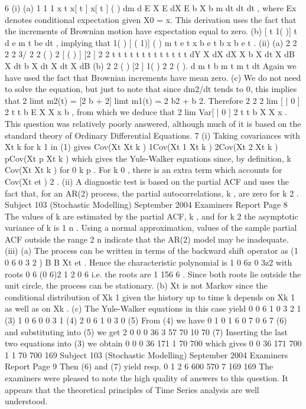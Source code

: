 6 (i) (a) 1
1
1
x t x[ t ] x[ t ] ( )
dm d
E X E dX E b X b m
dt dt dt
, where Ex
denotes conditional expectation given X0 = x. This derivation uses the
fact that the increments of Brownian motion have expectation equal to
zero.
(b) [ t 1( )] t d
e m t be
dt
, implying that
1( ) [ ( 1)] ( ) m t e t x b e t b x b e t .
(ii) (a) 2 2
2 2 3/ 2
2 ( ) 2 [ ( ) ]
[2 ] 2 2
t t t t t t t t t
t t t t
dY X dX dX X b X dt X dB X dt
b X dt X dt X dB
(b) 2
2 ( ) [2 ] 1( ) 2 2 ( ).
d
m t b m t m t
dt
Again we have used the fact
that Brownian increments have mean zero.
(c) We do not need to solve the equation, but just to note that since dm2/dt
tends to 0, this implies that 2 limt m2(t) = [2 b + 2] limt m1(t)
= 2 b2 + b 2. Therefore
2
2 2
lim [ | 0 ]
2 t t
b
E X X x b , from which we deduce that
2
lim Var[ | 0 ]
2 t t
b
X X x .
This question was relatively poorly answered, although much of it is based on
the standard theory of Ordinary Differential Equations.
7 (i) Taking covariances with Xt k for k 1 in (1) gives
Cov(Xt Xt k ) 1Cov(Xt 1 Xt k ) 2Cov(Xt 2 Xt k ) pCov(Xt p Xt k )
which gives the Yule-Walker equations since, by definition,
k Cov(Xt Xt k ) for 0 k p .
For k 0 , there is an extra term which accounts for Cov(Xt et ) 2 .
(ii) A diagnostic test is based on the partial ACF and uses the fact that, for an
AR(2) process, the partial autocorrelations, k , are zero for k 2 .
Subject 103 (Stochastic Modelling) September 2004 Examiners Report
Page 8
The values of k are estimated by the partial ACF, k , and for k 2 the
asymptotic variance of k is 1 n . Using a normal approximation, values of the
sample partial ACF outside the range 2 n indicate that the AR(2) model
may be inadequate.
(iii) (a) The process can be written in terms of the backward shift operator as
(1 0 6 0 3 2 ) B B Xt et .
Hence the characteristic polynomial is 1 0 6z 0 3z2 with roots
0 6 (0 6)2 1 2
0 6
i.e. the roots are 1 156 6 .
Since both roots lie outside the unit circle, the process can be
stationary.
(b) Xt is not Markov since the conditional distribution of Xk 1 given the
history up to time k depends on Xk 1 as well as on Xk .
(c) The Yule-Walker equations in this case yield
0 0 6 1 0 3 2 1 (3)
1 0 6 0 0 3 1 (4)
2 0 6 1 0 3 0 (5)
From (4) we have
0
1 0 1
6
0 7 0 6
7
(6)
and substituting into (5) we get
2 0 0 0
36 3 57
70 10 70
(7)
Inserting the last two equations into (3) we obtain
0 0 0
36 171
1
70 700
which gives
0 0
36 171 700
1 1
70 700 169
Subject 103 (Stochastic Modelling) September 2004 Examiners Report
Page 9
Then (6) and (7) yield resp.
0
1 2
6 600 570
7 169 169
The examiners were pleased to note the high quality of answers to this
question. It appears that the theoretical principles of Time Series analysis are
well understood.
